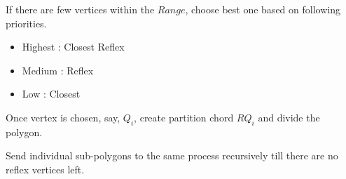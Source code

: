 \begin{frame}{}
\begin{list}{}{}
\item 
If there are few vertices within the $Range$, choose best one based on following priorities.
\begin{itemize}
\item Highest : Closest Reflex 
\item Medium : Reflex 
\item Low : Closest 
\end{itemize} 


\end{list}
\end{frame}

\begin{frame}{}
\begin{list}{}{}
\item Once vertex is chosen, say, $Q_i$, create partition chord $RQ_i$ and divide the  polygon.%

\item Send individual sub-polygons to the same process recursively till there are no reflex vertices left. 

\end{list}

\end{frame}

